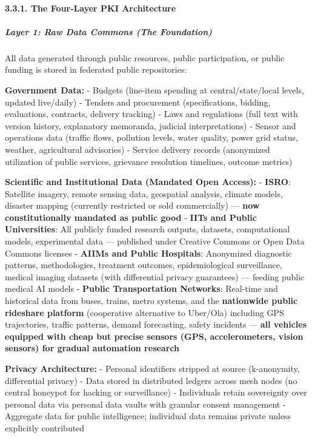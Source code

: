 \paragraph{3.3.1. The Four-Layer PKI
Architecture}\label{the-four-layer-pki-architecture}

\subparagraph{Layer 1: Raw Data Commons (The
Foundation)}\label{layer-1-raw-data-commons-the-foundation}

All data generated through public resources, public participation, or
public funding is stored in federated public repositories:

\textbf{Government Data:} - Budgets (line-item spending at
central/state/local levels, updated live/daily) - Tenders and
procurement (specifications, bidding, evaluations, contracts, delivery
tracking) - Laws and regulations (full text with version history,
explanatory memoranda, judicial interpretations) - Sensor and operations
data (traffic flows, pollution levels, water quality, power grid status,
weather, agricultural advisories) - Service delivery records (anonymized
utilization of public services, grievance resolution timelines, outcome
metrics)

\textbf{Scientific and Institutional Data (Mandated Open Access):} -
\textbf{ISRO}: Satellite imagery, remote sensing data, geospatial
analysis, climate models, disaster mapping (currently restricted or sold
commercially) --- \textbf{now constitutionally mandated as public good}
- \textbf{IITs and Public Universities}: All publicly funded research
outputs, datasets, computational models, experimental data --- published
under Creative Commons or Open Data Commons licenses - \textbf{AIIMs and
Public Hospitals}: Anonymized diagnostic patterns, methodologies,
treatment outcomes, epidemiological surveillance, medical imaging
datasets (with differential privacy guarantees) --- feeding public
medical AI models - \textbf{Public Transportation Networks}: Real-time
and historical data from buses, trains, metro systems, and the
\textbf{nationwide public rideshare platform} (cooperative alternative
to Uber/Ola) including GPS trajectories, traffic patterns, demand
forecasting, safety incidents --- \textbf{all vehicles equipped with
cheap but precise sensors (GPS, accelerometers, vision sensors) for
gradual automation research}

\textbf{Privacy Architecture:} - Personal identifiers stripped at source
(k-anonymity, differential privacy) - Data stored in distributed ledgers
across mesh nodes (no central honeypot for hacking or surveillance) -
Individuals retain sovereignty over personal data via personal data
vaults with granular consent management - Aggregate data for public
intelligence; individual data remains private unless explicitly
contributed

